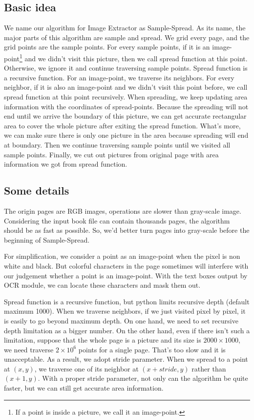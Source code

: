 \documentclass{article}
\begin{document}
\subsection{Basic idea}
We name our algorithm for Image Extractor as Sample-Spread. As its name, the major parts of this algorithm are sample and spread. We grid every page, and the grid points are the sample points. For every sample points, if it is an image-point\footnote{
If a point is inside a picture, we call it an image-point.
} and we didn't visit this picture, then we call spread function at this point. Otherwise, we ignore it and continue traversing sample points. Spread function is a recursive function. For an image-point, we traverse its neighbors. For every neighbor, if it is also an image-point and we didn't visit this point before, we call spread function at this point recursively. When spreading, we keep updating area information with the coordinates of spread-points. Because the spreading will not end until we arrive the boundary of this picture, we can get accurate rectangular area to cover the whole picture after exiting the spread function. What's more, we can make sure there is only one picture in the area because spreading will end at boundary. Then we continue traversing sample points until we visited all sample points. Finally, we cut out pictures from original page with area information we got from spread function. 
\subsection{Some details}
The origin pages are RGB images, operations are slower than gray-scale image. Considering the input book file can contain thousands pages, the algorithm should be as fast as possible. So, we'd better turn pages into gray-scale before the beginning of Sample-Spread. 

For simplification, we consider a point as an image-point when the pixel is non white and black. But colorful characters in the page sometimes will interfere with our judgement whether a point is an image-point. With the text boxes output by OCR module, we can locate these characters and mask them out. 

Spread function is a recursive function, but python limits recursive depth (default maximum 1000). When we traverse neighbors, if we just visited pixel by pixel, it is easily to go beyond maximum depth. On one hand, we need to set recursive depth limitation as a bigger number. On the other hand, even if there isn't such a limitation, suppose that the whole page is a picture and its size is $2000\times1000$, we need traverse $2\times10^6$ points for a single page. That's too slow and it is unacceptable. As a result, we adopt stride parameter. When we spread to a point at $(x,y)$, we traverse one of its neighbor at $(x+stride,y)$ rather than $(x+1,y)$. With a proper stride parameter, not only can the algorithm be quite faster, but we can still get accurate area information.
\end{document}
